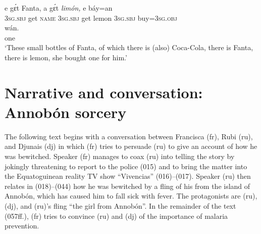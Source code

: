 {\gll
e  gɛ́t  Fanta,  a  gɛ́t  \textit{limón,}  e  báy=an   \\
\textsc{3sg.sbj}  get  \textsc{name}  \textsc{3sg.sbj}  get  lemon  \textsc{3sg.sbj}  buy=\textsc{3sg.obj}    \\
\gll
wán.   \\
one    \\
\glt
‘These small bottles of Fanta, of which there is (also) Coca-Cola, there is Fanta, there is lemon, she bought one for him.’
  }\z

\section{Narrative and conversation: Annobón sorcery}

The following text begins with a conversation between Francisca (fr), Rubi (ru), and Djunais (dj) in which (fr) tries to persuade (ru) to give an account of how he was bewitched. Speaker (fr) manages to coax (ru) into telling the story by jokingly threatening to report to the police (015) and to bring the matter into the Equatoguinean reality TV show “Vivencias” (016)–(017). Speaker (ru) then relates in (018)–(044) how he was bewitched by a fling of his from the island of Annobón, which has caused him to fall sick with fever. The protagonists are (ru), (dj), and (ru)’s fling “the girl from Annobón”. In the remainder of the text (057ff.), (fr) tries to convince (ru) and (dj) of the importance of malaria prevention.

